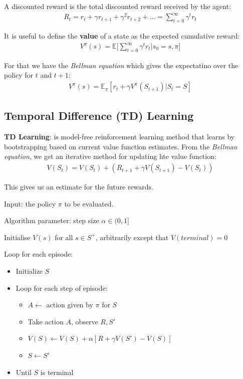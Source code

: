 \documentclass[11pt,a4paper,titlepage,dvipsnames,cmyk]{scrartcl}
\begin{document}
A discounted reward is the total discounted reward received by the agent:
\begin{align*}
R_t = r_t + \gamma r_{t+1} + \gamma^2 r_{t+2} + \dots = \sum_{t=0}^{\infty} \gamma^t r_t
\end{align*}

It is useful to define the \textbf{value} of a state as the expected cumulative reward:
\begin{align*}
V^\pi (s) = \mathbb{E} \Bigg [ \sum_{t=0}^{\infty} \gamma ^t r_t | s_0 = s, \pi \Bigg]
\end{align*}

For that we have the \textit{Bellman equation} which gives the expectatino over the policy for $t$ and $t+1$:
\begin{align*}
V^\pi (s) = \mathbb{E}_\pi [r_t + \gamma V^\pi (S_{t+1}) | S_t = S]
\end{align*}

\subsection{Temporal Difference (TD) Learning}
\textbf{TD Learning}: is model-free reinforcement learning method that learns by bootstrapping based on current value function estimates. From the \textit{Bellman equation}, we get an iterative method for updating hte value function:
\begin{align*}
V(S_t) = V(S_t) + (R_{t+1} + \gamma V(S_{t+1}) - V(S_t))
\end{align*}

This gives us an estimate for the future rewards.

\begin{tcolorbox} [space to upper,
collower=white,
title={Tabular TD(0) for estimating $v_\pi$},
nobeforeafter,
halign lower=flush right, ]
Input: the policy $\pi$ to be evaluated.

Algorithm parameter: step size $\alpha \in (0,1]$

Initialise $V(s)$ for all $s \in S^+$, arbitrarily except that $V(terminal) = 0$

Loop for each episode:
\begin{itemize}
    \item Initialize $S$
    \item Loop for each step of episode:
    \begin{itemize}
        \item $A \leftarrow$ action given by $\pi$ for $S$
        \item Take action $A$, observe $R,S'$
        \item $V(S) \leftarrow V(S) + \alpha[R + \gamma V(S') - V(S)]$
        \item $S \leftarrow S'$
    \end{itemize}
    \item Until $S$ is terminal
\end{itemize}
\end{tcolorbox}
\end{document}
